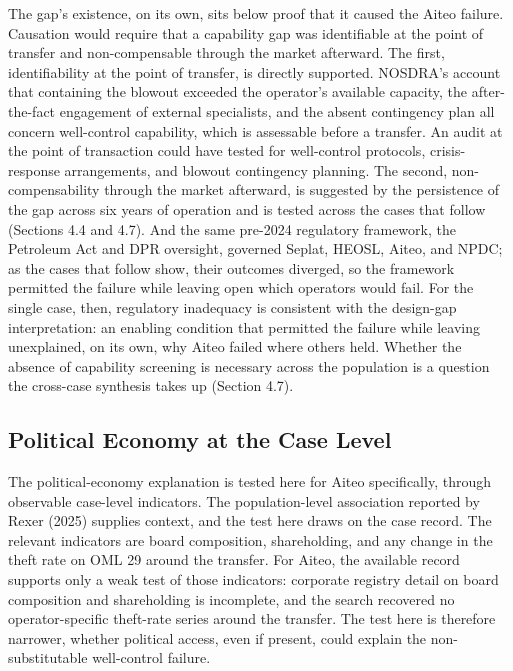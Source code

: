 \documentclass[twoside,fontset=lmodern]{mitthesis}
\begin{document}
The gap's existence, on its own, sits below proof that it caused the
Aiteo failure. Causation would require that a capability gap was
identifiable at the point of transfer and non-compensable through the
market afterward. The first, identifiability at the point of transfer,
is directly supported. NOSDRA's account that containing the blowout
exceeded the operator's available capacity, the after-the-fact
engagement of external specialists, and the absent contingency plan all
concern well-control capability, which is assessable before a transfer.
An audit at the point of transaction could have tested for well-control
protocols, crisis-response arrangements, and blowout contingency
planning. The second, non-compensability through the market afterward,
is suggested by the persistence of the gap across six years of operation
and is tested across the cases that follow (Sections 4.4 and 4.7). And
the same pre-2024 regulatory framework, the Petroleum Act and DPR
oversight, governed Seplat, HEOSL, Aiteo, and NPDC; as the cases that
follow show, their outcomes diverged, so the framework permitted the
failure while leaving open which operators would fail. For the single
case, then, regulatory inadequacy is consistent with the design-gap
interpretation: an enabling condition that permitted the failure while
leaving unexplained, on its own, why Aiteo failed where others held.
Whether the absence of capability screening is necessary across the
population is a question the cross-case synthesis takes up (Section
4.7).

\hypertarget{political-economy-at-the-case-level}{%
\subsection{Political Economy at the Case
Level}\label{political-economy-at-the-case-level}}

The political-economy explanation is tested here for Aiteo specifically,
through observable case-level indicators. The population-level
association reported by Rexer (2025) supplies context, and the test here
draws on the case record. The relevant indicators are board composition,
shareholding, and any change in the theft rate on OML 29 around the
transfer. For Aiteo, the available record supports only a weak test of
those indicators: corporate registry detail on board composition and
shareholding is incomplete, and the search recovered no
operator-specific theft-rate series around the transfer. The test here
is therefore narrower, whether political access, even if present, could
explain the non-substitutable well-control failure.
\end{document}
